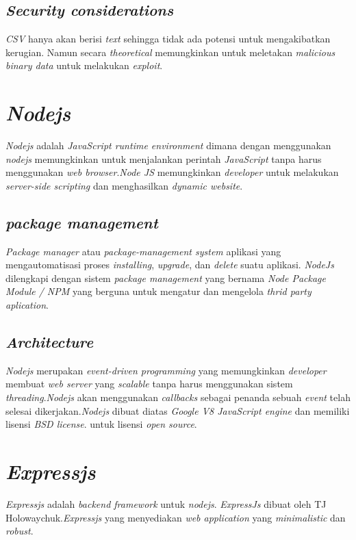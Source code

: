 \subsection{\textit{Security considerations}}
\textit{CSV} hanya akan berisi \textit{text} sehingga tidak ada potensi untuk mengakibatkan kerugian. Namun secara \textit{theoretical} memungkinkan untuk meletakan \textit{malicious binary data } untuk melakukan \textit{exploit}.


\section{\textit{Nodejs}}
\textit{Nodejs} adalah  \textit{JavaScript runtime environment } dimana dengan menggunakan \textit{nodejs} memungkinkan untuk menjalankan perintah \textit{ JavaScript} tanpa harus menggunakan \textit{web browser}.\textit{Node JS} memungkinkan \textit{developer} untuk melakukan \textit{server-side scripting} dan menghasilkan \textit{dynamic website}. \cite{Nodejs:01:about}


\subsection{\textit{package management }}
\textit{Package manager} atau \textit{package-management system}  aplikasi yang mengautomatisasi proses \textit{installing}, \textit{upgrade}, dan \textit{delete} suatu aplikasi.\cite{PackageManager:01:about} \textit{NodeJs} dilengkapi dengan sistem \textit{package management} yang bernama \textit{Node Package Module / NPM} yang berguna untuk mengatur dan mengelola \textit{thrid party aplication}.\cite{Nodejs:02:npm}

\subsection{\textit{Architecture}}
\textit{Nodejs} merupakan \textit{event-driven programming} yang memungkinkan \textit{developer} membuat \textit{web server} yang \textit{scalable} tanpa harus menggunakan sistem \textit{threading}.\textit{Nodejs} akan menggunakan \textit{callbacks} sebagai penanda sebuah \textit{event} telah selesai dikerjakan.\textit{Nodejs} dibuat diatas \textit{Google V8 JavaScript engine} dan memiliki lisensi \textit{BSD license}. untuk lisensi \textit{open source}\cite{nodejs:02:platform-arch}.


\section{\textit{Expressjs}}
\textit{Expressjs} adalah \textit{backend framework} untuk \textit{nodejs}. \textit{ExpressJs} dibuat oleh  TJ Holowaychuk.\textit{Expressjs} yang menyediakan \textit{web application} yang \textit{minimalistic} dan \textit{robust}.\cite{Express:01:Mozilla}

